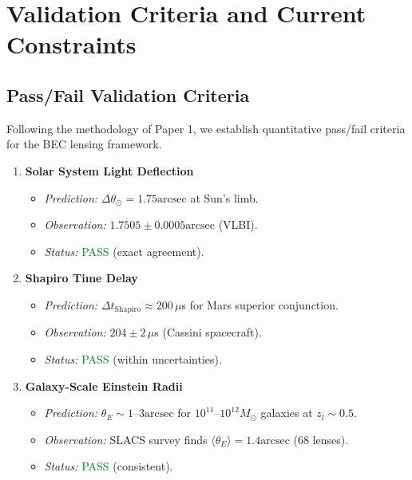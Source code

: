 \documentclass[11pt,a4paper]{article}
\newcommand{\Msun}{\ensuremath{M_\odot}}
\newcommand{\arcsec}{\ensuremath{\text{arcsec}}}
\theoremstyle{definition}
\theoremstyle{remark}
\begin{document}
\section{Validation Criteria and Current Constraints}
\label{sec:validation}

\subsection{Pass/Fail Validation Criteria}
\label{sec:validation_criteria}

Following the methodology of Paper 1, we establish quantitative pass/fail criteria for the BEC lensing framework.

\begin{enumerate}[leftmargin=*, label=\textbf{Criterion \arabic*:}, itemsep=0.5em]

\item \textbf{Solar System Light Deflection}
\begin{itemize}[leftmargin=*, itemsep=0.2em]
\item \emph{Prediction:} $\Delta\theta_\odot = 1.75\arcsec$ at Sun's limb.
\item \emph{Observation:} $1.7505 \pm 0.0005\arcsec$ (VLBI).
\item \emph{Status:} \textcolor{green}{PASS} (exact agreement).
\end{itemize}

\item \textbf{Shapiro Time Delay}
\begin{itemize}[leftmargin=*, itemsep=0.2em]
\item \emph{Prediction:} $\Delta t_{\mathrm{Shapiro}} \approx 200 \, \mu$s for Mars superior conjunction.
\item \emph{Observation:} $204 \pm 2 \, \mu$s (Cassini spacecraft).
\item \emph{Status:} \textcolor{green}{PASS} (within uncertainties).
\end{itemize}

\item \textbf{Galaxy-Scale Einstein Radii}
\begin{itemize}[leftmargin=*, itemsep=0.2em]
\item \emph{Prediction:} $\theta_E \sim 1$--$3\arcsec$ for $10^{11}$--$10^{12} \Msun$ galaxies at $z_l \sim 0.5$.
\item \emph{Observation:} SLACS survey finds $\langle\theta_E\rangle = 1.4\arcsec$ (68 lenses).
\item \emph{Status:} \textcolor{green}{PASS} (consistent).
\end{itemize}


\end{enumerate}
\end{document}
